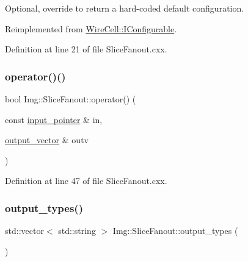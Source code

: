 Optional, override to return a hard-\/coded default configuration. 



Reimplemented from \hyperlink{class_wire_cell_1_1_i_configurable_a54841b2da3d1ea02189478bff96f7998}{Wire\+Cell\+::\+I\+Configurable}.



Definition at line 21 of file Slice\+Fanout.\+cxx.

\mbox{\label{class_wire_cell_1_1_img_1_1_slice_fanout_a054b9ee6d864e5734e4c21982d05e11c}} 
\subsubsection{\texorpdfstring{operator()()}{operator()()}}
{\footnotesize\ttfamily bool Img\+::\+Slice\+Fanout\+::operator() (\begin{DoxyParamCaption}\item[{const \hyperlink{class_wire_cell_1_1_i_fanout_node_aefd36d56a531edf1990fe6e263d9c266}{input\+\_\+pointer} \&}]{in,  }\item[{\hyperlink{class_wire_cell_1_1_i_fanout_node_a650cda83709781daac2d67af7c3706df}{output\+\_\+vector} \&}]{outv }\end{DoxyParamCaption})\hspace{0.3cm}{\ttfamily [virtual]}}



Definition at line 47 of file Slice\+Fanout.\+cxx.

\mbox{\label{class_wire_cell_1_1_img_1_1_slice_fanout_a98fe441e7e47306ff0352f547e9b9066}} 
\subsubsection{\texorpdfstring{output\+\_\+types()}{output\_types()}}
{\footnotesize\ttfamily std\+::vector$<$ std\+::string $>$ Img\+::\+Slice\+Fanout\+::output\+\_\+types (\begin{DoxyParamCaption}{ }\end{DoxyParamCaption})\hspace{0.3cm}{\ttfamily [virtual]}}



